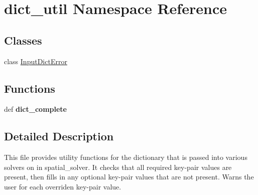 \hypertarget{namespacedict__util}{\section{dict\+\_\+util Namespace Reference}
\label{namespacedict__util}
}
\subsection*{Classes}
\begin{DoxyCompactItemize}
\item 
class \hyperlink{classdict__util_1_1_input_dict_error}{Input\+Dict\+Error}
\end{DoxyCompactItemize}
\subsection*{Functions}
\begin{DoxyCompactItemize}
\item 
\hypertarget{namespacedict__util_ae77e2d6dc8c45476739eff9bb8f257ea}{def {\bfseries dict\+\_\+complete}}\label{namespacedict__util_ae77e2d6dc8c45476739eff9bb8f257ea}

\end{DoxyCompactItemize}


\subsection{Detailed Description}
\begin{DoxyVerb}This file provides utility functions for the dictionary that is passed into various solvers on in spatial_solver.  It checks that all required key-pair values are present, then fills in any optional key-pair values that are not present.  Warns the user for each overriden key-pair value.\end{DoxyVerb}
 